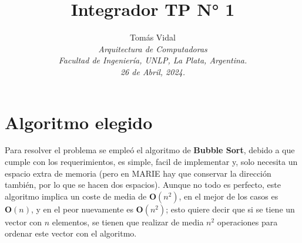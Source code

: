 \documentclass[letterpaper, 10 pt, conference]{ieeeconf}  %
\title{\LARGE \bf Integrador TP N° 1}
\author{
  Tom\'as Vidal\\
  {\it Arquitectura de Computadoras}\\
  {\it Facultad de Ingenier\'ia, UNLP, La Plata, Argentina.}\\
  {\it 26 de Abril, 2024.}
}                                            %
\begin{document}
\maketitle
\thispagestyle{empty}
\pagestyle{empty}

\section{Algoritmo elegido} \label{sec:bubble_sort}
Para resolver el problema se empleó el algoritmo de \textbf{Bubble Sort}, debido a que cumple con los requerimientos, es simple, facil de implementar y, solo necesita un espacio extra de memoria (pero en MARIE hay que conservar la dirección también, por lo que se hacen dos espacios). Aunque no todo es perfecto, este algoritmo implica un coste de media de $\textbf{O}(n^{2})$, en el mejor de los casos es $\textbf{O}(n)$, y en el peor nuevamente es $\textbf{O}(n^{2})$; esto quiere decir que si se tiene un vector con $n$ elementos, se tienen que realizar de media $n^{2}$ operaciones para ordenar este vector con el algoritmo.
\end{document}
